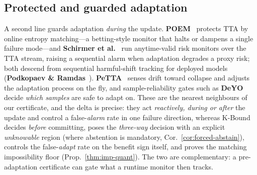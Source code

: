 \documentclass[conference]{IEEEtran}
\theoremstyle{plain}
\theoremstyle{definition}
\begin{document}
\subsection{Protected and guarded adaptation}
A second line guards adaptation \emph{during} the update. \textbf{POEM}~\cite{bar2024poem}
protects TTA by online entropy matching---a betting-style monitor that halts or dampens a
single failure mode---and \textbf{Schirmer et al.}~\cite{schirmer2025monitoring} run anytime-valid risk monitors over the
TTA stream, raising a sequential alarm when adaptation degrades a proxy risk; both descend
from sequential harmful-shift tracking for deployed models (\textbf{Podkopaev \& Ramdas}~\cite{podkopaev2022tracking}). \textbf{PeTTA}~\cite{hoang2024petta} senses drift toward collapse and adjusts the adaptation process on the fly, and sample-reliability gates such as \textbf{DeYO}~\cite{lee2024deyo} decide \emph{which samples} are safe to adapt on.
These are the nearest neighbours of our certificate, and the delta is precise: they act
\emph{reactively, during or after} the update and control a false-\emph{alarm} rate in one
failure direction, whereas K-Bound decides \emph{before} committing, poses the
\emph{three-way} decision with an explicit \emph{unknowable} region (where abstention is
mandatory, Cor.~\ref{cor:forced-abstain}), controls the false-\emph{adapt} rate on the
benefit sign itself, and proves the matching impossibility floor
(Prop.~\ref{thm:imp-quant}). The two are complementary: a pre-adaptation certificate can
gate what a runtime monitor then tracks.
\end{document}
